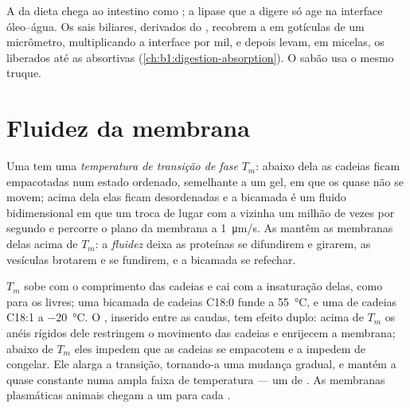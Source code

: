 \begin{example}\label{ex:b1:lipids:bile}
A  da dieta chega ao intestino como ; a lipase que a digere
só age na interface óleo--água. Os sais biliares, derivados 
do , recobrem a  em gotículas de um micrômetro,
multiplicando a interface por mil, e depois levam, em micelas, os  liberados até as  absortivas
(\cref{ch:b1:digestion-absorption}). O sabão usa o mesmo truque.
\end{example}

\section{Fluidez da membrana}

\begin{definition}\label{def:b1:lipids:fluidity}
Uma  tem uma
\emph{temperatura de transição de fase}
$T_m$: abaixo dela as cadeias ficam empacotadas num estado ordenado,
semelhante a um gel, em que os  quase não se movem; acima dela
elas ficam desordenadas e a bicamada é um fluido bidimensional em que um
 troca de lugar com a vizinha um milhão de vezes por segundo e
percorre o plano da membrana a \qty{1}{\micro m/s}. As  mantêm as
membranas delas acima de $T_m$: a
\emph{fluidez} deixa as proteínas se
difundirem e girarem, as vesículas brotarem e se fundirem, e a bicamada
se refechar.
\end{definition}

\begin{proposition}\label{prop:b1:lipids:fluidityfactors}
$T_m$ sobe com o comprimento das cadeias e cai com a insaturação delas,
como para os  livres; uma bicamada de cadeias C18:0 funde a
\qty{55}{\celsius}, e uma de cadeias C18:1 a \qty{-20}{\celsius}. O
, inserido entre as caudas, tem efeito duplo: acima de $T_m$
os anéis rígidos dele restringem o movimento das cadeias e enrijecem a
membrana; abaixo de $T_m$ eles impedem que as cadeias se empacotem e a
impedem de congelar. Ele alarga a transição, tornando-a uma mudança
gradual, e mantém a  quase constante numa ampla faixa de
temperatura --- um  de . As membranas plasmáticas animais
chegam a um  para cada .
\end{proposition}


